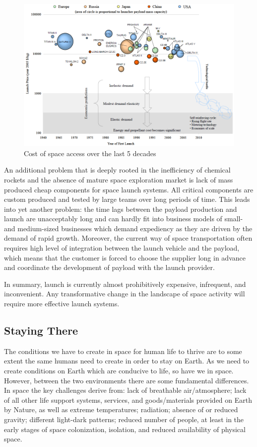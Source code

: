 \documentclass[letter,11pt]{article}
\begin{document}
\begin{figure}[bt!]
	\centering
	\includegraphics[width=\textwidth]{launch-cost}
	\caption{Cost of space access over the last 5 decades}
	\label{launch-cost}
\end{figure}

An additional problem that is deeply rooted in the inefficiency of chemical
rockets and the absence of mature space exploration market is lack of mass
produced cheap components for space launch systems. All critical components are
custom produced and tested by large teams over long periods of time. This leads
into yet another problem: the time lags between the payload production and
launch are unacceptably long and can hardly fit into business models of small-
and medium-sized businesses which demand expediency as they are driven by the
demand of rapid growth. Moreover, the current way of space transportation often
requires high level of integration between the launch vehicle and the payload,
which means that the customer is forced to choose the supplier long in advance
and coordinate the development of payload with the launch provider. 

In summary, launch is currently almost prohibitively expensive, infrequent, and
inconvenient. Any transformative change in the landscape of space activity will
require more effective launch systems.

\subsection{Staying There \label{staying-there}}

The conditions we have to create in space for human life to thrive are to some
extent the same humans need to create in order to stay on Earth. As we need to
create conditions on Earth which are conducive to life, so have we in space.
However, between the two environments there are some fundamental differences.
In space the key challenges derive from: lack of breathable air/atmosphere;
lack of all other life support systems, services, and goods/materials provided
on Earth by Nature, as well as extreme temperatures; radiation; absence of or
reduced gravity; different light-dark patterns; reduced number of people, at
least in the early stages of space colonization, isolation, and reduced
availability of physical space.
 
\end{document}

